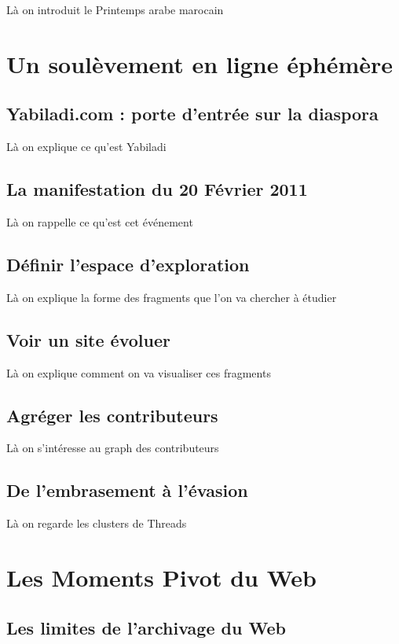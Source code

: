 \documentclass{tufte-book}
\begin{document}
Là on introduit le Printemps arabe marocain 

\section{Un soulèvement en ligne éphémère}

\subsection{Yabiladi.com : porte d'entrée sur la diaspora}

Là on explique ce qu'est Yabiladi

\subsection{La manifestation du 20 Février 2011}

Là on rappelle ce qu'est cet événement

\subsection{Définir l'espace d'exploration}

Là on explique la forme des fragments que l'on va chercher à étudier

\subsection{Voir un site évoluer}

Là on explique comment on va visualiser ces fragments

\subsection{Agréger les contributeurs}

Là on s'intéresse au graph des contributeurs

\subsection{De l'embrasement à l'évasion}

Là on regarde les clusters de Threads

\section{Les Moments Pivot du Web}

\subsection{Les limites de l'archivage du Web}
\end{document}
